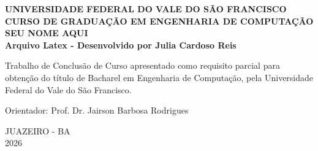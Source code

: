 \thispagestyle{empty}

\begin{center}
    
    \textbf{UNIVERSIDADE FEDERAL DO VALE DO SÃO FRANCISCO} \\
    \textbf{CURSO DE GRADUAÇÃO EM ENGENHARIA DE COMPUTAÇÃO} \\[4cm]
    
    \textbf{SEU NOME AQUI} \\[5cm]
    
    \textbf{\Large Arquivo Latex - Desenvolvido por Julia Cardoso Reis} \\ [3cm]

    \hspace*{0.5\textwidth} %
    \begin{minipage}{0.5\textwidth} %
        \small %
        \begin{singlespace} %
            Trabalho de Conclusão de Curso apresentado como requisito parcial para obtenção do título de Bacharel em Engenharia de Computação, pela Universidade Federal do Vale do São Francisco. 
            
            \vspace{1cm}
            Orientador: Prof. Dr. Jairson Barbosa Rodrigues
        \end{singlespace}
    \end{minipage}

    \vfill 
    
    JUAZEIRO - BA \\ 
    2026             
\end{center}